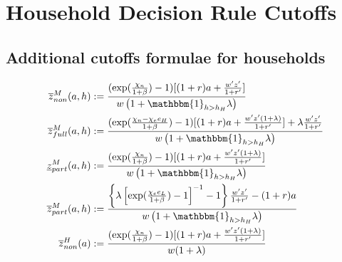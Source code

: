 \documentclass[12pt]{article}
\begin{document}
\printbibliography



\appendix
\renewcommand{\theequation}{\thesection.\arabic{equation}}
\makeatletter
{}
\makeatother

\renewcommand{\thefigure}{\thesection.\arabic{figure}}
\makeatletter
{}
\makeatother


\section{Household Decision Rule Cutoffs}
\subsection{Additional cutoffs formulae for households}
\label{app:cutoff_formulae}
\begin{align}
    \overline{z}^M_{non}(a,h)&:=\frac{(\exp(\frac{\chi_n}{1+\beta})-1)
    [(1+r)a+\frac{w'z'}{1+r'}]}{w\left(1+\mathbbm{1}_{h > h_H}\lambda\right)}  \label{eq:z-non-M} \\
    \overline{z}^M_{full}(a,h)&:=\frac{(\exp(\frac{\chi_n-\chi_e e_H}{1
    +\beta})-1)[(1+r)a+\frac{w'z'(1+\lambda)}{1+r'}]+\lambda\frac
    {w'z'}{1+r'}}{w\left(1+\mathbbm{1}_{h > h_H}\lambda\right)} \label{eq:z-slow-M} \\
    \underline{z}^M_{part}(a,h)&:=\frac{(\exp(\frac{\chi_n}{1+\beta})
    -1)[(1+r)a+\frac{w'z'(1+\lambda)}{1+r'}]}{w\left(1+\mathbbm{1}_{h > h_H}\lambda\right)} \label
    {eq:z-fast-lower-M} \\
    \overline{z}^M_{part}(a,h)&:=\frac{\left\{\lambda\left[\exp(\frac
    {\chi_e e_L}{1+\beta})-1\right]^{-1}-1\right\}\frac{w'z'}{1+r'}-
    (1+r)a}{w\left(1+\mathbbm{1}_{h > h_H}\lambda\right)}  \label{eq:z-fast-upper_M} \\
    \overline{z}^H_{non}(a)&:=\frac{(\exp(\frac{\chi_n}{1+\beta})-1)[(1+r)a+\frac{w'z'(1+\lambda)}{1+r'}]}{w(1+\lambda)}  
\end{align}
\end{document}
